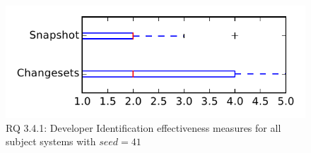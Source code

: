 
\begin{figure}
\centering
\includegraphics[height=0.4\textheight]{figures/dit_seed/rq1_tiny_41}
\caption{RQ 3.4.1: Developer Identification effectiveness measures for all subject systems with $seed=41$}
\label{fig:dit_seed:rq1:tiny}
\end{figure}
